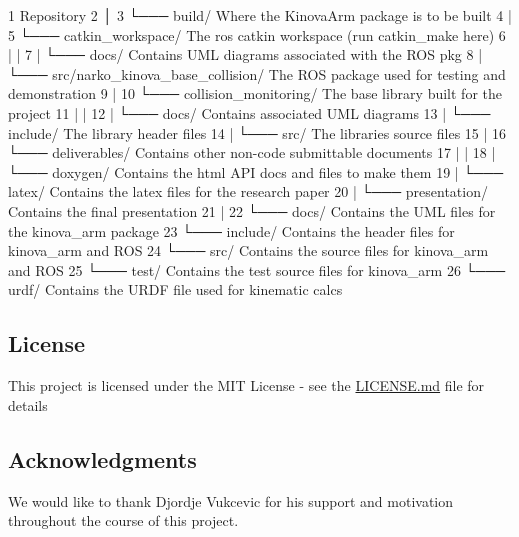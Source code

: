 \begin{DoxyCode}
1 Repository
2 │
3 └─── build/                                         Where the KinovaArm package is to be built
4 |
5 └─── catkin\_workspace/                              The ros catkin workspace (run catkin\_make here)
6 |   |
7 |   └─── docs/                                      Contains UML diagrams associated with the ROS pkg
8 |   └─── src/narko\_kinova\_base\_collision/           The ROS package used for testing and demonstration
9 |
10 └─── collision\_monitoring/                          The base library built for the project
11 |   |
12 |   └─── docs/                                      Contains associated UML diagrams
13 |   └─── include/                                   The library header files
14 |   └─── src/                                       The libraries source files
15 |
16 └─── deliverables/                                  Contains other non-code submittable documents
17 |   |
18 |   └─── doxygen/                                   Contains the html API docs and files to make them
19 |   └─── latex/                                     Contains the latex files for the research paper
20 |   └─── presentation/                              Contains the final presentation
21 |
22 └─── docs/                                          Contains the UML files for the kinova\_arm package
23 └─── include/                                       Contains the header files for kinova\_arm and ROS
24 └─── src/                                           Contains the source files for kinova\_arm and ROS
25 └─── test/                                          Contains the test source files for kinova\_arm
26 └─── urdf/                                          Contains the URDF file used for kinematic calcs
\end{DoxyCode}


\subsection*{License}

This project is licensed under the M\+IT License -\/ see the \hyperlink{md_LICENSE}{L\+I\+C\+E\+N\+SE.md} file for details

\subsection*{Acknowledgments}


\begin{DoxyItemize}
\item We would like to thank Djordje Vukcevic for his support and motivation throughout the course of this project.
\end{DoxyItemize}

